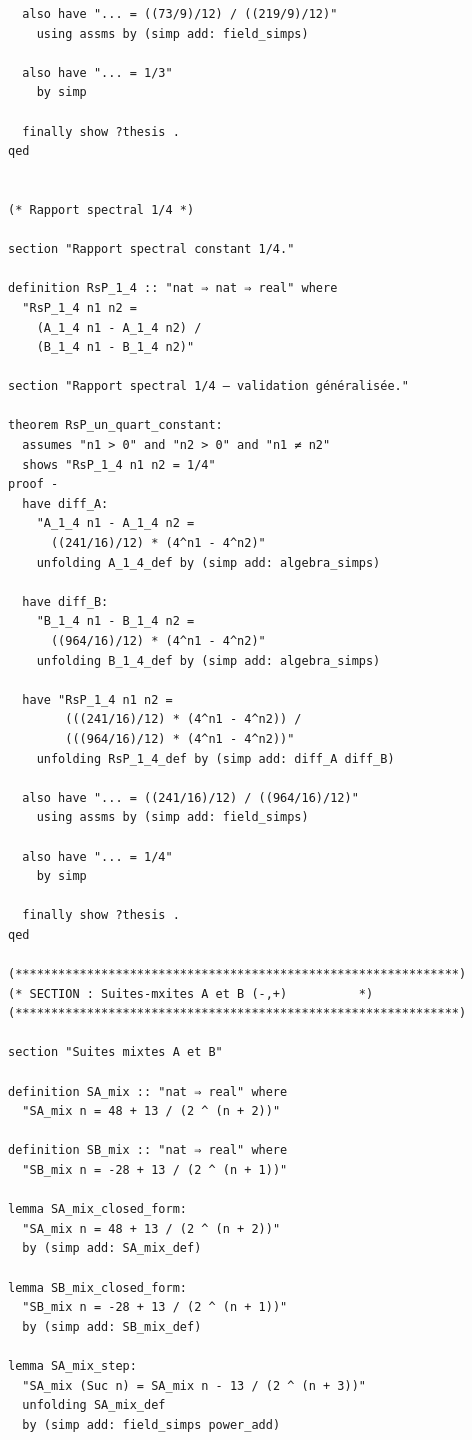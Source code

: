 \documentclass[a4paper,11pt]{article}
\begin{document}
\begin{holcode}[title={\textcolor{white}{File: methode\_spectral.thy -- Part 1/4}}]
\begin{lstlisting}
  also have "... = ((73/9)/12) / ((219/9)/12)"
    using assms by (simp add: field_simps)

  also have "... = 1/3"
    by simp

  finally show ?thesis .
qed


(* Rapport spectral 1/4 *)

section "Rapport spectral constant 1/4."

definition RsP_1_4 :: "nat ⇒ nat ⇒ real" where
  "RsP_1_4 n1 n2 =
    (A_1_4 n1 - A_1_4 n2) /
    (B_1_4 n1 - B_1_4 n2)"

section "Rapport spectral 1/4 – validation généralisée."

theorem RsP_un_quart_constant:
  assumes "n1 > 0" and "n2 > 0" and "n1 ≠ n2"
  shows "RsP_1_4 n1 n2 = 1/4"
proof -
  have diff_A:
    "A_1_4 n1 - A_1_4 n2 =
      ((241/16)/12) * (4^n1 - 4^n2)"
    unfolding A_1_4_def by (simp add: algebra_simps)

  have diff_B:
    "B_1_4 n1 - B_1_4 n2 =
      ((964/16)/12) * (4^n1 - 4^n2)"
    unfolding B_1_4_def by (simp add: algebra_simps)

  have "RsP_1_4 n1 n2 =
        (((241/16)/12) * (4^n1 - 4^n2)) /
        (((964/16)/12) * (4^n1 - 4^n2))"
    unfolding RsP_1_4_def by (simp add: diff_A diff_B)

  also have "... = ((241/16)/12) / ((964/16)/12)"
    using assms by (simp add: field_simps)

  also have "... = 1/4"
    by simp

  finally show ?thesis .
qed

(**************************************************************)
(* SECTION : Suites-mxites A et B (-,+)          *)
(**************************************************************)

section "Suites mixtes A et B"

definition SA_mix :: "nat ⇒ real" where
  "SA_mix n = 48 + 13 / (2 ^ (n + 2))"

definition SB_mix :: "nat ⇒ real" where
  "SB_mix n = -28 + 13 / (2 ^ (n + 1))"

lemma SA_mix_closed_form:
  "SA_mix n = 48 + 13 / (2 ^ (n + 2))"
  by (simp add: SA_mix_def)

lemma SB_mix_closed_form:
  "SB_mix n = -28 + 13 / (2 ^ (n + 1))"
  by (simp add: SB_mix_def)

lemma SA_mix_step:
  "SA_mix (Suc n) = SA_mix n - 13 / (2 ^ (n + 3))"
  unfolding SA_mix_def
  by (simp add: field_simps power_add)


\end{lstlisting}
\end{holcode}
\end{document}
